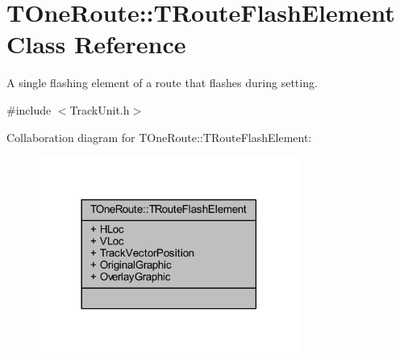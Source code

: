 \hypertarget{class_t_one_route_1_1_t_route_flash_element}{}\section{T\+One\+Route\+:\+:T\+Route\+Flash\+Element Class Reference}
\label{class_t_one_route_1_1_t_route_flash_element}


A single flashing element of a route that flashes during setting.  




{\ttfamily \#include $<$Track\+Unit.\+h$>$}



Collaboration diagram for T\+One\+Route\+:\+:T\+Route\+Flash\+Element\+:\nopagebreak
\begin{figure}[H]
\begin{center}
\leavevmode
\includegraphics[width=242pt]{class_t_one_route_1_1_t_route_flash_element__coll__graph}
\end{center}
\end{figure}

